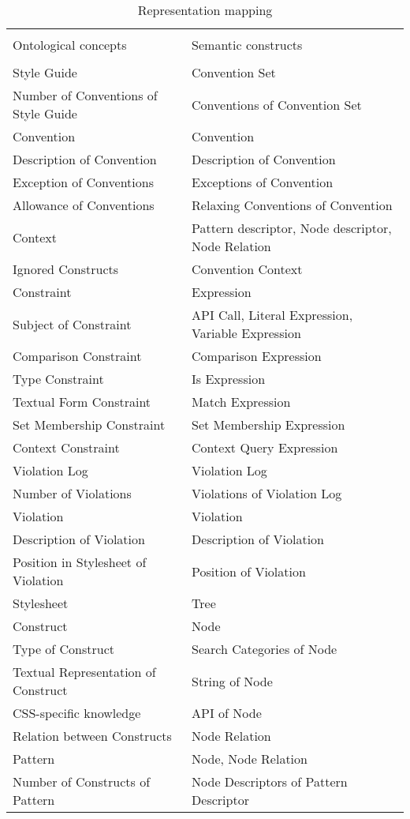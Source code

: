 \documentclass[parskip=full]{uvamscse}
\begin{document}
\begin{center}
\begin{longtable}{ | p{17em} | p{23em} | } 
\caption{Representation mapping}\\
\hline
 &  \\
Ontological concepts & Semantic constructs \\
 &  \\
\hline
Style Guide & Convention Set \\ \hline
Number of Conventions of Style Guide & Conventions of Convention Set \\ \hline
Convention & Convention \\ \hline
Description of Convention  & Description of Convention \\ \hline
Exception of Conventions & Exceptions of Convention \\ \hline
Allowance of Conventions & Relaxing Conventions of Convention \\ \hline
Context & Pattern descriptor, Node descriptor, Node Relation \\ \hline
Ignored Constructs & Convention Context \\ \hline
Constraint & Expression \\ \hline
Subject of Constraint & API Call, Literal Expression, Variable Expression \\ \hline
Comparison Constraint & Comparison Expression \\ \hline
Type Constraint & Is Expression \\ \hline
Textual Form Constraint & Match Expression \\ \hline
Set Membership Constraint & Set Membership Expression \\ \hline
Context Constraint & Context Query Expression \\ \hline
Violation Log & Violation Log \\ \hline
Number of Violations & Violations of Violation Log \\ \hline
Violation & Violation \\ \hline
Description of Violation & Description of Violation \\ \hline
Position in Stylesheet of Violation & Position of Violation \\ \hline
Stylesheet & Tree \\ \hline
Construct & Node \\ \hline
Type of Construct & Search Categories of Node \\ \hline
Textual Representation of Construct & String of Node \\ \hline
CSS-specific knowledge & API of Node \\ \hline
Relation between Constructs & Node Relation \\ \hline
Pattern & Node, Node Relation \\ \hline
Number of Constructs of Pattern & Node Descriptors of Pattern Descriptor \\ \hline
\end{longtable}
\end{center}
\end{document}
